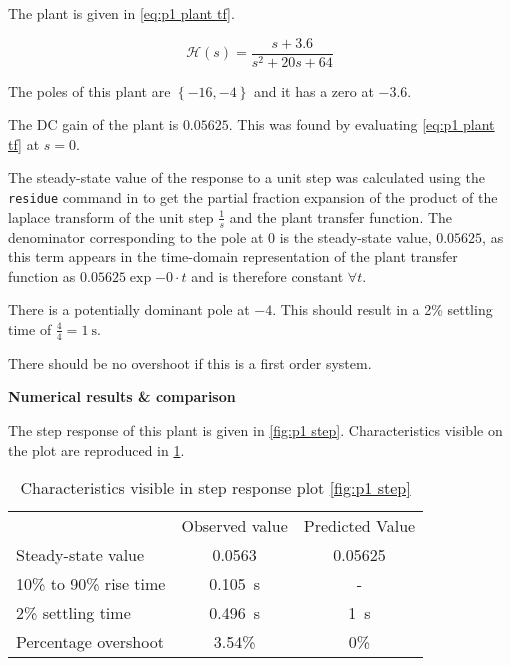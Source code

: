 \problem

The plant is given in \cref{eq:p1 plant tf}.

\begin{equation}
\label{eq:p1 plant tf}
\mathcal{H}\left(s\right) = \frac{s+3.6}{s^2+20s+64}
\end{equation}

The poles of this plant are $\left\{-16, -4\right\}$ and it has a zero at $-3.6$.

The DC gain of the plant is $0.05625$. This was found by evaluating \cref{eq:p1 plant tf} at $s=0$.

The steady-state value of the response to a unit step was calculated using the \texttt{residue} command in \matlab to get the partial fraction expansion of the product of the laplace transform of the unit step $\frac{1}{s}$ and the plant transfer function. The denominator corresponding to the pole at 0 is the steady-state value, $0.05625$, as this term appears in the time-domain representation of the plant transfer function as $0.05625\exp{-0\cdot t}$ and is therefore constant $\forall t$.

There is a potentially dominant pole at $-4$. This should result in a 2\% settling time of $\frac{4}{4}=\SI{1}{\second}$. 

There should be no overshoot if this is a first order system.

\smallskip\textbf{Numerical results \& comparison}

The step response of this plant is given in \cref{fig:p1 step}. Characteristics visible on the plot are reproduced in \cref{tab:p1 step characteristics}.

\begin{table}[h]
    \centering
    \caption{Characteristics visible in step response plot \cref{fig:p1 step}}
    \label{tab:p1 step characteristics}
    \begin{tabular}{lcc}
        \toprule
        &Observed value&Predicted Value\\
        Steady-state value&0.0563&0.05625\\
        10\% to 90\% rise time&\SI{0.105}{\second}&-\\
        2\% settling time&\SI{0.496}{\second}&\SI{1}{\second}\\
        Percentage overshoot&3.54\%&0\%\\
        \bottomrule
    \end{tabular}
\end{table}

